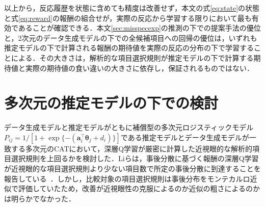 \documentclass[paper]{ieicej}
\begin{document}
以上から，反応履歴を状態に含めても精度は改善せず，本文の式\eqref{eq:state}の状態と式\eqref{eq:reward}の報酬の組合せが，実際の反応から学習する限りにおいて最も有効であることが確認できる．本文\ref{sec:misspecexp}の推測の下での提案手法の優位と，2次元のデータ生成モデルの下での全候補項目への回帰の優位は，いずれも推定モデルの下で計算される報酬の期待値を実際の反応の分布の下で学習することによる．その大きさは，解析的な項目選択規則が推定モデルの下で計算する期待値と実際の期待値の食い違いの大きさに依存し，保証されるものではない．

\section{多次元の推定モデルの下での検討}\label{app:mirt}

データ生成モデルと推定モデルがともに補償型の多次元ロジスティックモデル$P_{ij}=1/[1+\exp\{-(\bm{a}_i^{\top}\bm{\theta}_j+d_i)\}]$である推定モデルとデータ生成モデルが一致する多次元のCATにおいて，深層Q学習が厳密に計算した近視眼的な解析的項目選択規則を上回るかを検討した．Liらは，事後分散に基づく報酬の深層Q学習が近視眼的な項目選択規則より少ない項目数で所定の事後分散に到達することを報告している~\cite{LiGibbonsRockova2026}．しかし，比較対象の項目選択規則は事後分布をモンテカルロ近似で評価していたため，改善が近視眼性の克服によるのか近似の粗さによるのかは明らかでなかった．
\end{document}
